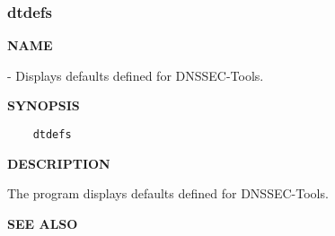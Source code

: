 \clearpage

\subsubsection{\bf dtdefs}

{\bf NAME}

 - Displays defaults defined for DNSSEC-Tools.

{\bf SYNOPSIS}

\begin{verbatim}
    dtdefs
\end{verbatim}

{\bf DESCRIPTION}

The  program displays defaults defined for DNSSEC-Tools.

{\bf SEE ALSO}

